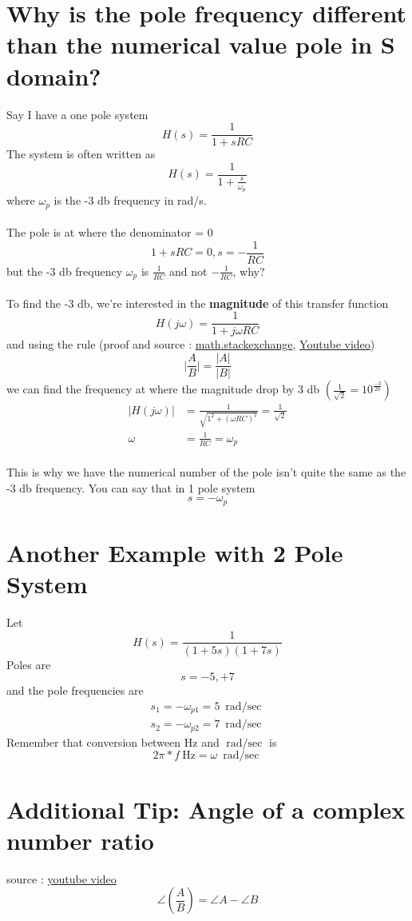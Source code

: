 \documentclass{article}
\begin{document}
	\section{Why is the pole frequency different than the numerical value pole in S domain?}
	Say I have a one pole system
	\[H(s)=\frac{1}{1+sRC}\]
	The system is often written as
	\[H(s)=\frac{1}{1+\frac{s}{\omega_p}}\]
	where $\omega_p$ is the -3 \si{\decibel} frequency in \si{\radian/\second}.\\\\
	The pole is at where the denominator = 0
	\[1+sRC=0, s=-\frac{1}{RC}\]
	but the -3 \si{\decibel} frequency $\omega_p$ is $\frac{1}{RC}$ and not $-\frac{1}{RC}$, why?\\\\
	To find the -3 \si{\decibel}, we're interested in the \textbf{magnitude} of this transfer function
	\[H(j\omega)=\frac{1}{1+j\omega RC}\]
	and using the rule (proof and source : \href{URLhttps://math.stackexchange.com/questions/766841/is-this-a-valid-method-of-finding-magnitude-of-complex-fraction}{math.stackexchange}, \href{https://youtu.be/8NquqDYpqPw?feature=shared&t=237}{Youtube video})
	\[\big|\frac{A}{B}\big|=\frac{\big|A\big|}{\big|B\big|}\]
	we can find the frequency at where the magnitude drop by 3 \si{\decibel} $\left(\frac{1}{\sqrt{2}}=10^\frac{-3}{20}\right)$
	\begin{align*}
		\big|H(j\omega)\big|&=\frac{1}{\sqrt{1^2+\left(\omega RC\right)^2}}=\frac{1}{\sqrt{2}}\\
		\omega&=\frac{1}{RC}=\omega_p
	\end{align*}
	\\ This is why we have the numerical number of the pole isn't quite the same as the -3 \si{\decibel} frequency. You can say that in 1 pole system
	\[s=-\omega_p\]
	
	\section{Another Example with 2 Pole System}
	Let
	\[H(s)=\frac{1}{(1+5s)(1+7s)}\]
	Poles are
	\[s=-5, +7\]
	and the pole frequencies are 
	\begin{align*}
		s_1=-\omega_{p1}=5\ \si{\radian\per\sec}\\
		s_2=-\omega_{p2}=7\ \si{\radian\per\sec}
	\end{align*}
	Remember that conversion between Hz and $\si{\radian\per\sec}$ is
	\[2\pi*f\ \si{\hertz} = \omega\ \si{\radian\per\sec}\]
	\section{Additional Tip: Angle of a complex number ratio}
	source : \href{https://youtu.be/8NquqDYpqPw?feature=shared&t=384}{youtube video}
	\[\angle\left(\frac{A}{B}\right)=\angle A-\angle B\]
\end{document}
